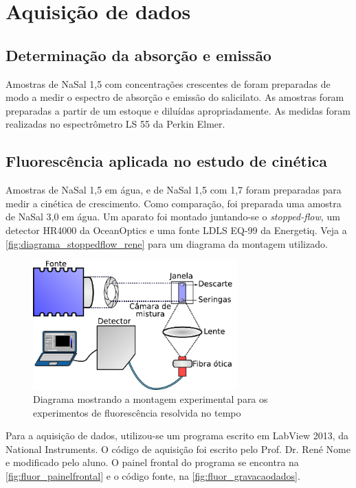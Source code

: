 		\section{Aquisição de dados}
			\subsection{Determinação da absorção e emissão}
			
			Amostras de NaSal 1,5\mM{} com concentrações crescentes de \TTAB{} foram preparadas de modo a medir o espectro de absorção e emissão do salicilato. As amostras foram preparadas a partir de um estoque e diluídas apropriadamente. As medidas foram realizadas no espectrômetro LS 55 da Perkin Elmer.
			
			\subsection{Fluorescência aplicada no estudo de cinética}
			\label{sec:experimental_fluor_resolvida}

			Amostras de NaSal 1,5\mM{} em água, e de NaSal 1,5 \mM{} com \TTAB{} 1,7 \mM{} foram preparadas para medir a cinética de crescimento. Como comparação, foi preparada uma amostra de NaSal 3,0 \mM{} em água.  Um aparato foi montado juntando-se o \emph{stopped-flow}, um detector HR4000 da OceanOptics e uma fonte LDLS EQ-99 da Energetiq. Veja a \autoref{fig:diagrama_stoppedflow_rene} para um diagrama da montagem utilizado.
			
			\begin{figure}[h]
				\centering
				\includegraphics[width=0.7\textwidth]{imagens/fluor/diagrama_stopped_flow_rene}
				\caption{Diagrama mostrando a montagem experimental para os experimentos de fluorescência resolvida no tempo}
				\label{fig:diagrama_stoppedflow_rene}
			\end{figure}
			
			Para a aquisição de dados, utilizou-se um programa escrito em LabView 2013, da National Instruments. O código de aquisição foi escrito pelo Prof. Dr. René Nome e modificado pelo aluno. O painel frontal do programa se encontra na \autoref{fig:fluor_painelfrontal} e o código fonte, na \autoref{fig:fluor_gravacaodados}.
			
